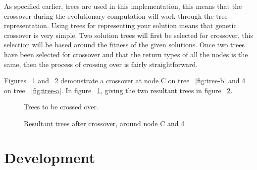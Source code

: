 \documentclass[12pt]{article}
\begin{document}
As specified earlier, trees are used in this implementation, this means that the crossover during the evolutionary computation
will work through the tree representation. Using trees for representing your solution means that genetic crossover is
very simple. Two solution trees will first be selected for crossover, this selection will be based around the fitness of the given
solutions. Once two trees
have been selected for crossover and that the return types of all the nodes is the same, then the process of crossing over
is fairly straightforward.

Figures ~\ref{fig:treesab} and ~\ref{fig:resultanttrees} demonstrate a crossover at node C on tree ~\ref{fig:tree-b} and 4 on tree ~\ref{fig:tree-a}. In
figure  ~\ref{fig:treesab}, giving the two resultant trees in figure ~\ref{fig:resultanttrees}.

\begin{figure} [ht]
\centering
\subfigure[]{\label{fig:tree-b}\Tree [.A [ D E ].B [ F G H I ].C ]}
\hfil
\subfigure[]{\label{fig:tree-a}\Tree [.1 [ 4 5 6 7 ].2 [ 8 9 ].3 ]}
\caption{Trees to be crossed over.\label{fig:treesab}}
\end{figure}

\begin{figure} [ht]
\centering
\subfigure[]{\label{fig:tree-Ra}\Tree [.A [ D E ].B 4 ]}
\hfil
{}
\caption{Resultant trees after crossover, around node C and 4 \label{fig:resultanttrees}}
\end{figure}


\section{Development}
\end{document}
